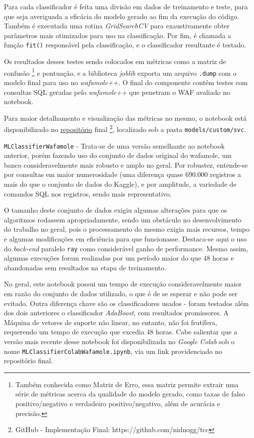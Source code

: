\begin{alineas}
Para cada classificador é feita uma divisão em dados de treinamento e teste, para que seja averiguada a eficácia do modelo gerado ao fim da execução do código. Também é executada uma rotina \textit{GridSearchCV} para exaustivamente obter parâmetros mais otimizados para uso na classificação. Por fim, é chamada a função \verb+fit()+ responsável pela classificação, e o classificador resultante é testado. 

Os resultados desses testes sendo colocados em métricas como a matriz de confusão \footnote{Também conhecida como Matriz de Erro, essa matriz permite extrair uma série de métricas acerca da qualidade do modelo gerado, como taxas de falso positivo/negativo e verdadeiro positivo/negativo, além de acurácia e precisão.} e pontuação, e a biblioteca \textit{joblib} exporta um arquivo \verb+.dump+ com o modelo final para uso no \textit{wafamole++}. O final do componente contém testes com consultas SQL geradas pelo \textit{wafamole++} que penetram o WAF avaliado no notebook.

Para maior detalhamento e visualização das métricas no mesmo, o notebook está disponibilizado no \href{https://github.com/nidnogg/tcc}{repositório} final \footnote{GitHub - Implementação Final: https://github.com/nidnogg/tcc}, localizado sob a pasta \verb+models/custom/svc+.

\item \verb+MLClassifierWafamole+ - Trata-se de uma versão semelhante ao notebook anterior, porém fazendo uso do conjunto de dados original do wafamole, um banco consideravelmente mais robusto e amplo no geral. Por robustez, entende-se por consultas em maior numerosidade (uma diferença quase 690.000 registros a mais do que o conjunto de dados do Kaggle), e por amplitude, a variedade de comandos SQL nos registros, sendo mais representativo. 

O tamanho deste conjunto de dados exigiu algumas alterações para que os algoritmos rodassem apropriadamente, sendo um obstáculo no desenvolvimento do trabalho no geral, pois o processamento do mesmo exigia mais recursos, tempo e algumas modificações em eficiência para que funcionasse. Destaca-se aqui o uso do \textit{back-end} paralelo \verb+ray+ \cite{ray_backend_parallel} como considerável ganho de performance. Mesmo assim, algumas execuções foram realizadas por um período maior do que 48 horas e abandonadas sem resultados na etapa de treinamento.

No geral, este notebook possui um tempo de execução consideravelmente maior  em razão do conjunto de dados utilizado, o que é de se esperar e não pode ser evitado. Outra diferença chave são os classificadores usados - foram testados além dos dois anteriores o classificador \textit{AdaBoost}, com resultados promissores. A Máquina de vetores de suporte não linear, no entanto, não foi frutífera, requerendo um tempo de execução que excedia 48 horas. Cabe salientar que a versão mais recente desse notebook foi disponibilizada no \textit{Google Colab} sob o nome \verb+MLClassifierColabWafamole.ipynb+, via um link providenciado no repositório final.
\end{alineas}

